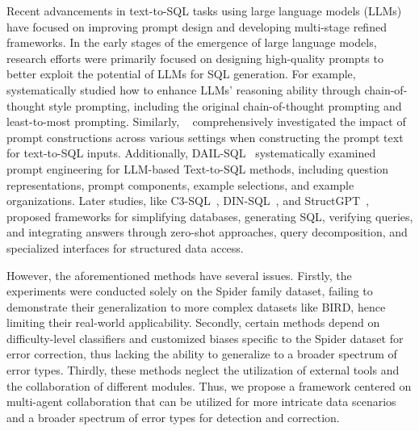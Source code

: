 Recent advancements in text-to-SQL tasks using large language models (LLMs) have focused on improving prompt design and developing multi-stage refined frameworks. 
In the early stages of the emergence of large language models, research efforts were primarily focused on designing high-quality prompts to better exploit the potential of LLMs for SQL generation. 
For example, \citep{tai2023exploring} systematically studied how to enhance LLMs' reasoning ability through chain-of-thought style prompting, including the original chain-of-thought prompting and least-to-most prompting. 
Similarly, ~\citep{chang2023prompt} comprehensively investigated the impact of prompt constructions across various settings when constructing the prompt text for text-to-SQL inputs. 
Additionally, DAIL-SQL~\citep{gao2023texttosql} systematically examined prompt engineering for LLM-based Text-to-SQL methods, including question representations, prompt components, example selections, and example organizations.
Later studies, like C3-SQL~\citep{dong2023c3}, DIN-SQL~\citep{pourreza2023dinsql}, and StructGPT~\citep{jiang2023structgpt}, proposed frameworks for simplifying databases, generating SQL, verifying queries, and integrating answers through zero-shot approaches, query decomposition, and specialized interfaces for structured data access.

However, the aforementioned methods have several issues. 
Firstly, the experiments were conducted solely on the Spider family dataset, failing to demonstrate their generalization to more complex datasets like BIRD, hence limiting their real-world applicability. 
Secondly, certain methods depend on difficulty-level classifiers and customized biases specific to the Spider dataset for error correction, thus lacking the ability to generalize to a broader spectrum of error types.
Thirdly, these methods neglect the utilization of external tools and the collaboration of different modules.
Thus, we propose a framework centered on multi-agent collaboration that can be utilized for more intricate data scenarios and a broader spectrum of error types for detection and correction.

